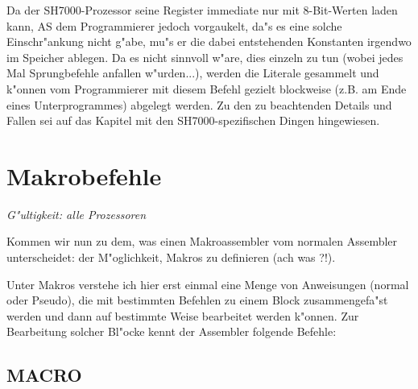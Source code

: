 \documentclass[12pt,a4paper,twoside]{report}
\makeatletter
\newcommand{\ttindex}[1]{\index{#1@{\tt #1}}}
\newcommand{\asname}{AS}
\makeatother
\begin{document}
Da der SH7000-Prozessor seine Register immediate nur mit 8-Bit-Werten
laden kann, \asname{} dem Programmierer jedoch vorgaukelt, da"s es eine solche
Einschr"ankung nicht g"abe, mu"s er die dabei entstehenden Konstanten
irgendwo im Speicher ablegen.  Da es nicht sinnvoll w"are, dies einzeln
zu tun (wobei jedes Mal Sprungbefehle anfallen w"urden...), werden die
Literale gesammelt und k"onnen vom Programmierer mit diesem Befehl
gezielt blockweise (z.B. am Ende eines Unterprogrammes) abgelegt werden.
Zu den zu beachtenden Details und Fallen sei auf das Kapitel mit den
SH7000-spezifischen Dingen hingewiesen.


\section{Makrobefehle}

{\em G"ultigkeit: alle Prozessoren}

Kommen wir nun zu dem, was einen Makroassembler vom normalen Assembler
unterscheidet: der M"oglichkeit, Makros zu definieren (ach was ?!).
\par
Unter Makros verstehe ich hier erst einmal eine Menge von Anweisungen
(normal oder Pseudo), die mit bestimmten Befehlen zu einem Block
zusammengefa"st werden und dann auf bestimmte Weise bearbeitet
werden k"onnen.  Zur Bearbeitung solcher Bl"ocke kennt der Assembler
folgende Befehle:


\subsection{MACRO}
\ttindex{MACRO}\ttindex{ENDM}
\label{SectMacros}
\end{document}
